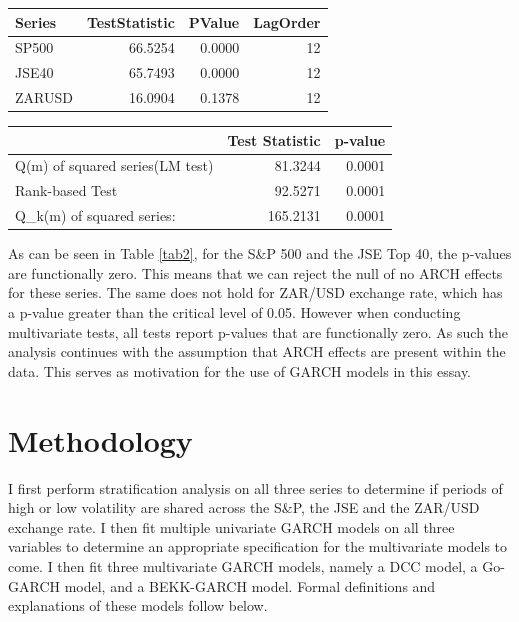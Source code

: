 \documentclass[11pt,preprint, authoryear]{elsarticle}
\let\origtable\table
\let\endorigtable\endtable
\renewenvironment{table}[1][2] {
    \expandafter\origtable\expandafter[H]
} {
    \endorigtable
}
\numberwithin{equation}{section}
\numberwithin{figure}{section}
\numberwithin{table}{section}
\begin{document}
\begin{table}[H]
\centering
\caption{Ljung-Box Tests \label{tab2}} 
\begin{tabular}{lrrr}
  \hline
Series & TestStatistic & PValue & LagOrder \\ 
  \hline
SP500 & 66.5254 & 0.0000 & 12 \\ 
  JSE40 & 65.7493 & 0.0000 & 12 \\ 
  ZARUSD & 16.0904 & 0.1378 & 12 \\ 
   \hline
\end{tabular}
\end{table}

\begin{table}[H]
\centering
\caption{MV Portmanteau Tests \label{tab3}} 
\begin{tabular}{lrr}
  \hline
 & Test Statistic & p-value \\ 
  \hline
Q(m) of squared series(LM test) & 81.3244 & 0.0001 \\ 
  Rank-based Test & 92.5271 & 0.0001 \\ 
  Q\_k(m) of squared series: & 165.2131 & 0.0001 \\ 
   \hline
\end{tabular}
\end{table}

As can be seen in Table \ref{tab2}, for the S\&P 500 and the JSE Top 40,
the p-values are functionally zero. This means that we can reject the
null of no ARCH effects for these series. The same does not hold for
ZAR/USD exchange rate, which has a p-value greater than the critical
level of 0.05. However when conducting multivariate tests, all tests
report p-values that are functionally zero. As such the analysis
continues with the assumption that ARCH effects are present within the
data. This serves as motivation for the use of GARCH models in this
essay.

\hypertarget{methodology}{%
\section{Methodology}\label{methodology}}

I first perform stratification analysis on all three series to determine
if periods of high or low volatility are shared across the S\&P, the JSE
and the ZAR/USD exchange rate. I then fit multiple univariate GARCH
models on all three variables to determine an appropriate specification
for the multivariate models to come. I then fit three multivariate GARCH
models, namely a DCC model, a Go-GARCH model, and a BEKK-GARCH model.
Formal definitions and explanations of these models follow below.
\end{document}
